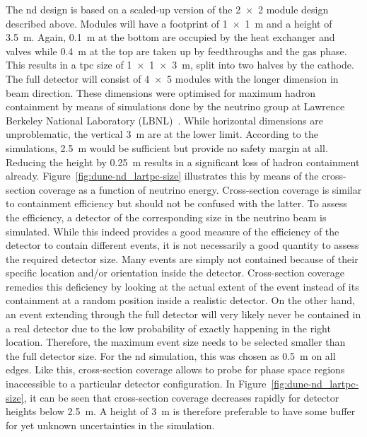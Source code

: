 The \AC{} \gls{nd} design is based on a scaled-up version of the \num{2 x 2} module design described above.
Modules will have a footprint of \SI{1 x 1}{\metre} and a height of \SI{3.5}{\metre}.
Again, \SI{0.1}{\metre} at the bottom are occupied by the heat exchanger and valves while \SI{0.4}{\metre} at the top are taken up by feedthroughs and the gas phase.
This results in a \gls{tpc} size of \SI{1 x 1 x 3}{\metre}, split into two halves by the cathode.
The full detector will consist of \num{4 x 5} modules with the longer dimension in beam direction.
These dimensions were optimised for maximum hadron containment by means of simulations done by the neutrino group at Lawrence Berkeley National Laboratory (LBNL)~\cite{lartpcSizeChris}.
While horizontal dimensions are unproblematic, the vertical \SI{3}{\metre} are at the lower limit.
According to the simulations, \SI{2.5}{\metre} would be sufficient but provide no safety margin at all.
Reducing the height by \SI{0.25}{\metre} results in a significant loss of hadron containment already.
Figure~\ref{fig:dune-nd_lartpc-size} illustrates this by means of the cross-section coverage as a function of neutrino energy.
Cross-section coverage is similar to containment efficiency but should not be confused with the latter.
To assess the efficiency, a detector of the corresponding size in the neutrino beam is simulated.
While this indeed provides a good measure of the efficiency of the detector to contain different events, it is not necessarily a good quantity to assess the required detector size.
Many events are simply not contained because of their specific location and/or orientation inside the detector.
Cross-section coverage remedies this deficiency by looking at the actual extent of the event instead of its containment at a random position inside a realistic detector.
On the other hand, an event extending through the full detector will very likely never be contained in a real detector due to the low probability of exactly happening in the right location.
Therefore, the maximum event size needs to be selected smaller than the full detector size.
For the \gls{nd} simulation, this was chosen as \SI{0.5}{\metre} on all edges.
Like this, cross-section coverage allows to probe for phase space regions inaccessible to a particular detector configuration.
In Figure~\ref{fig:dune-nd_lartpc-size}, it can be seen that cross-section coverage decreases rapidly for detector heights below \SI{2.5}{\metre}.
A height of \SI{3}{\metre} is therefore preferable to have some buffer for yet unknown uncertainties in the simulation.

